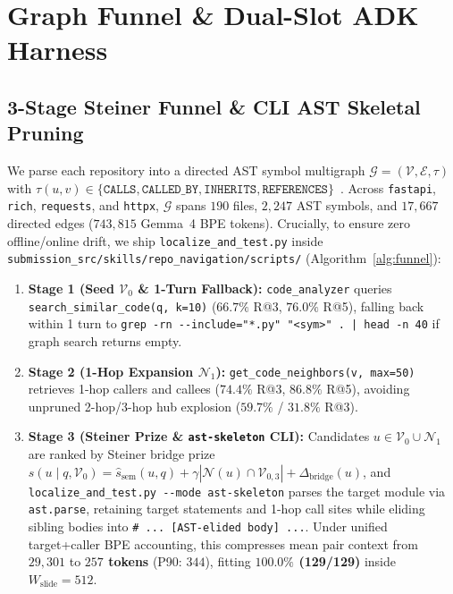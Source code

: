 \documentclass[10pt,twocolumn,letterpaper]{article}
\begin{document}
\section{Graph Funnel \& Dual-Slot ADK Harness}
\label{sec:method}

\subsection{3-Stage Steiner Funnel \& CLI AST Skeletal Pruning}
We parse each repository into a directed AST symbol multigraph $\mathcal{G}=(\mathcal{V},\mathcal{E},\tau)$ with $\tau(u,v) \in \{\texttt{CALLS}, \allowbreak \texttt{CALLED\_BY}, \allowbreak \texttt{INHERITS}, \allowbreak \texttt{REFERENCES}\}$~\cite{ouyang2025repograph,chen2025locagent,yu2025orcaloca}. Across \texttt{fastapi}, \texttt{rich}, \texttt{requests}, and \texttt{httpx}, $\mathcal{G}$ spans $190$ files, $2{,}247$ AST symbols, and $17{,}667$ directed edges ($743{,}815$ Gemma~4 BPE tokens). Crucially, to ensure zero offline/online drift, we ship \texttt{localize\_and\_test.py} inside \texttt{submission\_src/skills/repo\_navigation/scripts/} (Algorithm~\ref{alg:funnel}):
\begin{enumerate}
    \item \textbf{Stage 1 (Seed $\mathcal{V}_0$ \& 1-Turn Fallback):} \texttt{code\_analyzer} queries \texttt{search\_similar\_code(q, k=10)} ($66.7\%$ R@3, $76.0\%$ R@5), falling back within 1 turn to \texttt{grep -rn -\/-include="*.py" "<sym>" . | head -n 40} if graph search returns empty.
    \item \textbf{Stage 2 (1-Hop Expansion $\mathcal{N}_1$):} \texttt{get\_code\_neighbors(v, max=50)} retrieves 1-hop callers and callees ($74.4\%$ R@3, $86.8\%$ R@5), avoiding unpruned 2-hop/3-hop hub explosion ($59.7\%$ / $31.8\%$ R@3).
    \item \textbf{Stage 3 (Steiner Prize \& \texttt{ast-skeleton} CLI):} Candidates $u \in \mathcal{V}_0 \cup \mathcal{N}_1$ are ranked by Steiner bridge prize $s(u \mid q,\mathcal{V}_0) = \hat{s}_{\text{sem}}(u,q) + \gamma|\mathcal{N}(u)\cap\mathcal{V}_{0,3}| + \Delta_{\text{bridge}}(u)$, and \texttt{localize\_and\_test.py -\/-mode ast-skeleton} parses the target module via \texttt{ast.parse}, retaining target statements and 1-hop call sites while eliding sibling bodies into \texttt{\# ... [AST-elided body] ...}. Under unified target+caller BPE accounting, this compresses mean pair context from $29,301$ to \textbf{$257$ tokens} (P90: $344$), fitting \textbf{$100.0\%$ (129/129)} inside $W_{\text{slide}}{=}512$.
\end{enumerate}
\end{document}
